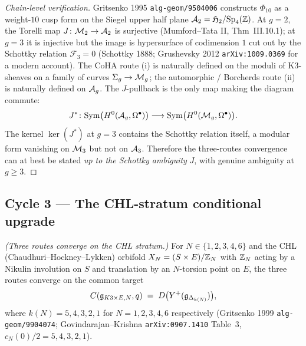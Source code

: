 \begin{proof}[Chain-level verification]
Gritsenko 1995 \texttt{alg-geom/9504006} constructs
$\Phi_{10}$ as a weight-$10$ cusp form on the Siegel upper half
plane $\mathcal{A}_2 = \mathfrak{H}_2/\mathrm{Sp}_4(\mathbb{Z})$. At $g = 2$, the
Torelli map $J \colon \mathcal{M}_2 \to \mathcal{A}_2$ is surjective (Mumford--Tata
II, Thm~III.10.1); at $g = 3$ it is injective but the image is
hypersurface of codimension $1$ cut out by the Schottky
relation $\mathcal{F}_3 = 0$ (Schottky 1888; Grushevsky 2012
\texttt{arXiv:1009.0369} for a modern account).
The CoHA route (i) is naturally defined on the moduli of K$3$-sheaves
on a family of curves $\Sigma_g \to \mathcal{M}_g$; the automorphic / Borcherds
route (ii) is naturally defined on $\mathcal{A}_g$. The $J$-pullback is the
only map making the diagram commute:
\[
  J^*\colon \mathrm{Sym}\bigl(H^0(\mathcal{A}_g, \Omega^\bullet)\bigr)
  \longrightarrow
  \mathrm{Sym}\bigl(H^0(\mathcal{M}_g, \Omega^\bullet)\bigr).
\]
The kernel $\ker(J^*)$ at $g = 3$ contains the Schottky relation
itself, a modular form vanishing on $\mathcal{M}_3$ but not on $\mathcal{A}_3$.
Therefore the three-routes convergence can at best be stated
\emph{up to the Schottky ambiguity} $J$, with genuine ambiguity at
$g \geq 3$.
\end{proof}

\subsection{Cycle 3 --- The CHL-stratum conditional upgrade}

 \emph{(Three routes converge on the CHL stratum.)}
For $N \in \{1, 2, 3, 4, 6\}$ and the CHL (Chaudhuri--Hockney--Lykken)
orbifold $X_N = (S \times E)/\mathbb{Z}_N$ with $\mathbb{Z}_N$ acting by a
Nikulin involution on $S$ and translation by an $N$-torsion point on
$E$, the three routes converge on the common target
\[
  C(\mathfrak{g}_{K3 \times E, N}, q)
  \;=\;
  D\bigl(Y^{+}(\mathfrak{g}_{\Delta_{k(N)}})\bigr),
\]
where $k(N) = 5, 4, 3, 2, 1$ for $N = 1, 2, 3, 4, 6$ respectively
(Gritsenko 1999 \texttt{alg-geom/9904074}; Govindarajan--Krishna
\texttt{arXiv:0907.1410} Table~3, $c_N(0)/2 = 5, 4, 3, 2, 1$).


